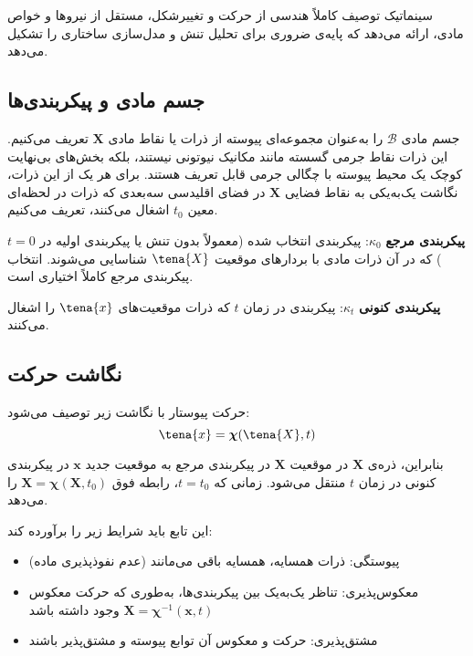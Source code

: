 \begin{keypoint}
	سینماتیک توصیف کاملاً هندسی از حرکت و تغییرشکل، مستقل از نیروها و خواص مادی، ارائه می‌دهد که پایه‌ی ضروری برای تحلیل تنش و مدل‌سازی ساختاری را تشکیل می‌دهد.
\end{keypoint}

\subsection{جسم مادی و پیکربندی‌ها}

جسم مادی $\mathcal{B}$ را به‌عنوان مجموعه‌ای پیوسته از ذرات یا نقاط مادی $\mathbf{X}$ تعریف می‌کنیم. این ذرات نقاط جرمی گسسته مانند مکانیک نیوتونی نیستند، بلکه بخش‌های بی‌نهایت کوچک یک محیط پیوسته با چگالی جرمی قابل تعریف هستند. برای هر یک از این ذرات، نگاشت یک‌به‌یکی به نقاط فضایی $\mathbf{X}$ در فضای اقلیدسی سه‌بعدی که ذرات در لحظه‌ای معین $t_0$ اشغال می‌کنند، تعریف می‌کنیم.

\textbf{پیکربندی مرجع} $\kappa_0$: پیکربندی انتخاب شده (معمولاً بدون تنش یا پیکربندی اولیه در $t = 0$) که در آن ذرات مادی با بردارهای موقعیت $\tena{X}$ شناسایی می‌شوند. انتخاب پیکربندی مرجع کاملاً اختیاری است.

\textbf{پیکربندی کنونی} $\kappa_t$: پیکربندی در زمان $t$ که ذرات موقعیت‌های $\tena{x}$ را اشغال می‌کنند.

\subsection{نگاشت حرکت}

حرکت پیوستار با نگاشت زیر توصیف می‌شود:
\begin{equation}
	\tena{x} = \boldsymbol{\chi}(\tena{X}, t)
\end{equation}

بنابراین، ذره‌ی $\mathbf{X}$ در موقعیت $\mathbf{X}$ در پیکربندی مرجع به موقعیت جدید $\mathbf{x}$ در پیکربندی کنونی در زمان $t$ منتقل می‌شود. زمانی که $t = t_0$، رابطه فوق $\mathbf{X} = \boldsymbol{\chi}(\mathbf{X}, t_0)$ را می‌دهد.

این تابع باید شرایط زیر را برآورده کند:
\begin{itemize}
	\item پیوستگی: ذرات همسایه، همسایه باقی می‌مانند (عدم نفوذپذیری ماده)
	\item معکوس‌پذیری: تناظر یک‌به‌یک بین پیکربندی‌ها، به‌طوری که حرکت معکوس $\mathbf{X} = \boldsymbol{\chi}^{-1}(\mathbf{x}, t)$ وجود داشته باشد
	\item مشتق‌پذیری: حرکت و معکوس آن توابع پیوسته و مشتق‌پذیر باشند
\end{itemize}

